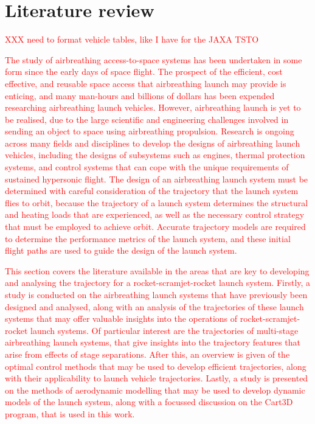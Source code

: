 
\cleardoublepage
\chapter{Literature review}\label{chapter:literature-review}
  \textcolor{red}{XXX need to format vehicle tables, like I have for the JAXA TSTO}

	
  \textcolor{red}{
  The study of airbreathing access-to-space systems has been undertaken in some form since the early days of space flight. The prospect of the efficient, cost effective, and reusable space access that airbreathing launch may provide is enticing, and many man-hours and billions of dollars has been expended researching airbreathing launch vehicles. However, airbreathing launch is yet to be realised, due to the large scientific and engineering challenges involved in sending an object to space using airbreathing propulsion. Research is ongoing across many fields and disciplines to develop the designs of airbreathing launch vehicles, including the designs of subsystems such as engines, thermal protection systems, and control systems that can cope with the unique requirements of sustained hypersonic flight. 
}
\textcolor{red}{
  The design of an airbreathing launch system must be determined with careful consideration of the trajectory that the launch system flies to orbit, because the trajectory of a launch system determines the structural and heating loads that are experienced, as well as the necessary control strategy that must be employed to achieve orbit. Accurate trajectory models are required to determine the performance metrics of the launch system, and these initial flight paths are used to guide the design of the launch system.
}



\textcolor{red}{
This section covers the literature available in the areas that are key to developing and analysing the trajectory for a rocket-scramjet-rocket launch system. 
Firstly, a study is conducted on the airbreathing launch systems that have previously been designed and analysed, along with an analysis of the trajectories of these launch systems that may offer valuable insights into the operations of rocket-scramjet-rocket launch systems. Of particular interest are the trajectories of multi-stage airbreathing launch systems, that give insights into the trajectory features that arise from effects of stage separations. 
After this, an overview is given of the optimal control methods that may be used to develop efficient trajectories, along with their applicability to launch vehicle trajectories. 
Lastly, a study is presented on the methods of aerodynamic modelling that may be used to develop dynamic models of the launch system, along with a focussed discussion on the Cart3D program, that is used in this work. 
}

